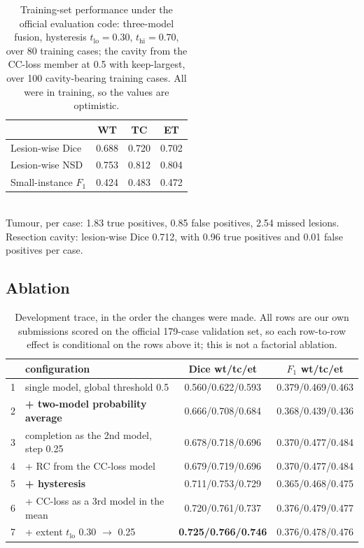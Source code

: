 \documentclass[runningheads]{llncs}
\begin{document}
\begin{table}[t]
\centering
\caption{Training-set performance under the official evaluation code: three-model fusion,
hysteresis $t_{\mathrm{lo}}=0.30$, $t_{\mathrm{hi}}=0.70$, over 80 training cases; the cavity from
the CC-loss member at 0.5 with keep-largest, over 100 cavity-bearing training cases. All were
in training, so the values are optimistic.}
\label{tab:train}
\begin{tabular}{@{}lccc@{}}
\toprule
 & WT & TC & ET \\
\midrule
Lesion-wise Dice     & 0.688 & 0.720 & 0.702 \\
Lesion-wise NSD      & 0.753 & 0.812 & 0.804 \\
Small-instance $F_1$ & 0.424 & 0.483 & 0.472 \\
\bottomrule
\end{tabular}\\[2pt]
{\footnotesize Tumour, per case: 1.83 true positives, 0.85 false positives, 2.54 missed lesions.\\
Resection cavity: lesion-wise Dice 0.712, with 0.96 true positives and 0.01 false positives per
case.}
\end{table}

\subsection{Ablation}
\label{sec:ablation}

\begin{table}[t]
\centering
\caption{Development trace, in the order the changes were made. All rows are our own submissions
scored on the official 179-case validation set, so each row-to-row effect is conditional on the
rows above it; this is not a factorial ablation.}
\label{tab:ablation}
\begin{tabular}{@{}llcc@{}}
\toprule
 & configuration & Dice wt/tc/et & $F_1$ wt/tc/et \\
\midrule
1 & single model, global threshold 0.5 & 0.560/0.622/0.593 & 0.379/0.469/0.463 \\
2 & \textbf{+ two-model probability average} & 0.666/0.708/0.684 & 0.368/0.439/0.436 \\
3 & \phantom{+} completion as the 2nd model, step 0.25 & 0.678/0.718/0.696 & 0.370/0.477/0.484 \\
4 & + RC from the CC-loss model        & 0.679/0.719/0.696 & 0.370/0.477/0.484 \\
5 & \textbf{+ hysteresis}              & 0.711/0.753/0.729 & 0.365/0.468/0.475 \\
6 & + CC-loss as a 3rd model in the mean & 0.720/0.761/0.737 & 0.376/0.479/0.477 \\
7 & + extent $t_{\mathrm{lo}}$ 0.30 $\to$ 0.25 & \textbf{0.725/0.766/0.746} & 0.376/0.478/0.476 \\
\bottomrule
\end{tabular}
\end{table}
\end{document}
